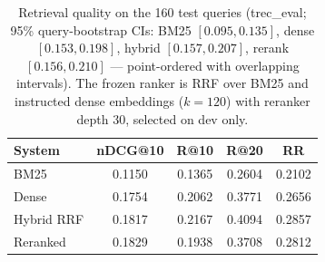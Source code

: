 \begin{table}[t]
\centering
\caption{Retrieval quality on the 160 test queries (trec\_eval; 95\% query-bootstrap CIs: BM25 $[0.095,0.135]$, dense $[0.153,0.198]$, hybrid $[0.157,0.207]$, rerank $[0.156,0.210]$ --- point-ordered with overlapping intervals). The frozen ranker is RRF over BM25 and instructed dense embeddings ($k=120$) with reranker depth 30, selected on dev only.}
\label{tab:retrieval}
\begin{tabular}{lcccc}
\toprule
System & nDCG@10 & R@10 & R@20 & RR \\
\midrule
BM25 & 0.1150 & 0.1365 & 0.2604 & 0.2102 \\
Dense & 0.1754 & 0.2062 & 0.3771 & 0.2656 \\
Hybrid RRF & 0.1817 & 0.2167 & 0.4094 & 0.2857 \\
Reranked & 0.1829 & 0.1938 & 0.3708 & 0.2812 \\
\bottomrule
\end{tabular}
\end{table}

